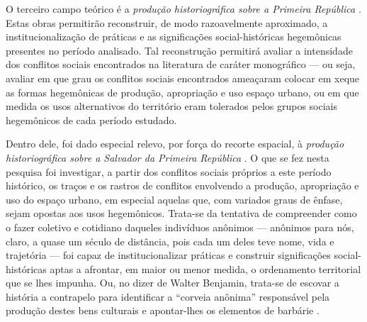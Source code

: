 O terceiro campo teórico é a \textit{produção historiográfica sobre a Primeira República} \cite{BRUNO1967, carone_evolucao_1977, CARONE1970inst, faoro_donos_2001, freyre_ordem_2004, janotti_subversivos_1986, leal_coronelismo_2012, LINS1988coro, PEDROSA1966a, PEDROSA1966b, pires_eleicoes_1995, saes_classemedia_1975, silva_historiaeconomica_2002}. Estas obras permitirão reconstruir, de modo razoavelmente aproximado, a institucionalização de práticas \cite{BERNARDO1991} e as significações social-históricas \cite{CASTORIADIS1982} hegemônicas presentes no período analisado. Tal reconstrução permitirá avaliar a intensidade dos conflitos sociais encontrados na literatura de caráter monográfico --- ou seja, avaliar em que grau os conflitos sociais encontrados ameaçaram colocar em xeque as formas hegemônicas de produção, apropriação e uso espaço urbano, ou em que medida os usos alternativos do território eram tolerados pelos grupos sociais hegemônicos de cada período estudado.

Dentro dele, foi dado especial relevo, por força do recorte espacial, à \textit{produção historiográfica sobre a Salvador da Primeira República} \cite{araujo_inventario_1992, castellucci_maquina_2008, CUNHA2011, sampaio_partidos_1978, sampaio_legislativo_1985, santos_associacao_1985, pang_coronelismo_1979}. O que se fez nesta pesquisa foi investigar, a partir dos conflitos sociais próprios a este período histórico, os traços e os rastros de conflitos envolvendo a produção, apropriação e uso do espaço urbano, em especial aquelas que, com variados graus de ênfase, sejam opostas aos usos hegemônicos. Trata-se da tentativa de compreender como o fazer coletivo e cotidiano daqueles indivíduos anônimos --- anônimos para nós, claro, a quase um século de distância, pois cada um deles teve nome, vida e trajetória --- foi capaz de institucionalizar práticas \cite{BERNARDO1991} e construir significações social-históricas \cite{CASTORIADIS1982} aptas a afrontar, em maior ou menor medida, o ordenamento territorial que se lhes impunha. Ou, no dizer de Walter Benjamin, trata-se de escovar a história a contrapelo para identificar a ``corveia anônima'' responsável pela produção destes bens culturais e apontar-lhes os elementos de barbárie \cite[p.~225]{BENJAMIN1987}.

